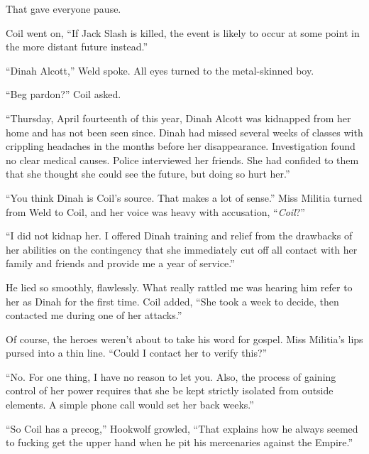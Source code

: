 That gave everyone pause.



Coil went on, ``If Jack Slash is killed, the event is likely to occur at some point in the more distant future instead.''



``Dinah Alcott,'' Weld spoke.  All eyes turned to the metal-skinned boy.



``Beg pardon?'' Coil asked.



``Thursday, April fourteenth of this year, Dinah Alcott was kidnapped from her home and has not been seen since.  Dinah had missed several weeks of classes with crippling headaches in the months before her disappearance.  Investigation found no clear medical causes.  Police interviewed her friends.  She had confided to them that she thought she could see the future, but doing so hurt her.''



``You think Dinah is Coil's source.  That makes a lot of sense.''  Miss Militia turned from Weld to Coil, and her voice was heavy with accusation, ``\emph{Coil}?''



``I did not kidnap her.  I offered Dinah training and relief from the drawbacks of her abilities on the contingency that she immediately cut off all contact with her family and friends and provide me a year of service.''



He lied so smoothly, flawlessly.  What really rattled me was hearing him refer to her as Dinah for the first time.  Coil added, ``She took a week to decide, then contacted me during one of her attacks.''



Of course, the heroes weren't about to take his word for gospel.  Miss Militia's lips pursed into a thin line.  ``Could I contact her to verify this?''



``No.  For one thing, I have no reason to let you.  Also, the process of gaining control of her power requires that she be kept strictly isolated from outside elements.  A simple phone call would set her back weeks.''



``So Coil has a precog,'' Hookwolf growled, ``That explains how he always seemed to fucking get the upper hand when he pit his mercenaries against the Empire.''



